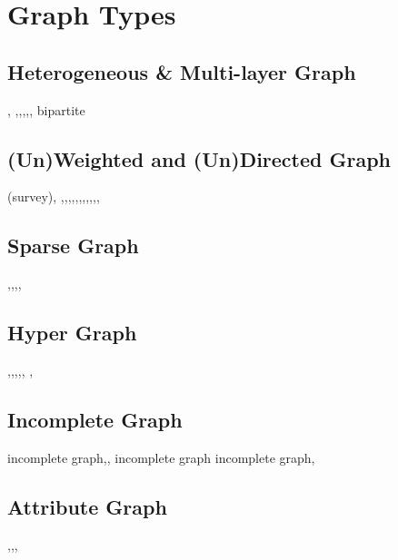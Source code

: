 \section{Graph Types}
\subsection{Heterogeneous \& Multi-layer Graph}
,\cite{dong2012clustering}
\cite{cheng2013flexible},\cite{ni2016self},\cite{liu2015robust},\cite{philip2015mcd},\cite{ni2015flexible},\cite{larremore2014efficiently} bipartite

\subsection{(Un)Weighted and (Un)Directed Graph}
\cite{malliaros2013clustering}(survey),
\cite{leicht2008community},\cite{kim2010finding},\cite{guimera2007module},\cite{yang2010directed},\cite{nicosia2009extending},\cite{wen2018direction},\cite{klymko2014using},\cite{sun2015framework},\cite{li2013detecting},\cite{sun2014weighting},\cite{satuluri2011symmetrizations},\cite{lu2014algorithms}

\subsection{Sparse Graph}
\cite{zhang2014phase},\cite{decelle2011inference},\cite{zhao2015gsparsify},\cite{angelini2015spectral},

\subsection{Hyper Graph}
\cite{li2017inhomogeneous},\cite{wu2018nonnegative},\cite{yin2018higher},\cite{leordeanu2012efficient},\cite{ghoshdastidar2014consistency},
,\cite{benson2016higher}

\subsection{Incomplete Graph}
\cite{zhang2013community}  incomplete graph,\cite{chen2014clustering},\cite{lin2012community} incomplete graph \cite{sun2012relation}incomplete graph,\cite{zhang2013enhanced}

\subsection{Attribute Graph}
\cite{hu2016co},,\cite{li2018community},\cite{zhou2010clustering}

